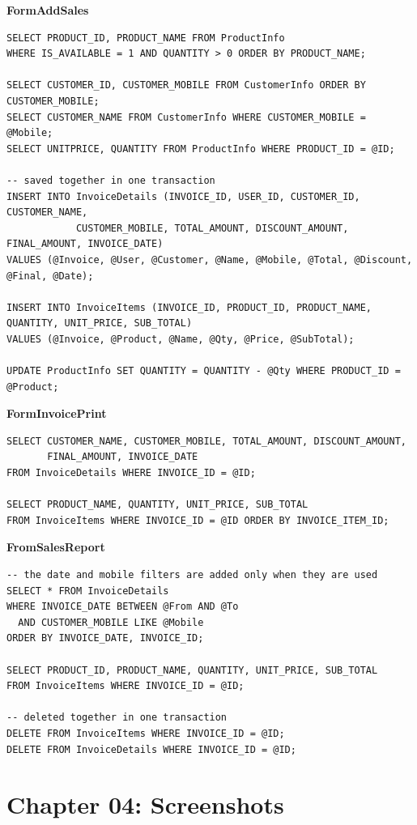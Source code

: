 \documentclass[12pt,a4paper]{article}
\begin{document}
\textbf{FormAddSales}
\begin{lstlisting}
SELECT PRODUCT_ID, PRODUCT_NAME FROM ProductInfo
WHERE IS_AVAILABLE = 1 AND QUANTITY > 0 ORDER BY PRODUCT_NAME;

SELECT CUSTOMER_ID, CUSTOMER_MOBILE FROM CustomerInfo ORDER BY CUSTOMER_MOBILE;
SELECT CUSTOMER_NAME FROM CustomerInfo WHERE CUSTOMER_MOBILE = @Mobile;
SELECT UNITPRICE, QUANTITY FROM ProductInfo WHERE PRODUCT_ID = @ID;

-- saved together in one transaction
INSERT INTO InvoiceDetails (INVOICE_ID, USER_ID, CUSTOMER_ID, CUSTOMER_NAME,
            CUSTOMER_MOBILE, TOTAL_AMOUNT, DISCOUNT_AMOUNT, FINAL_AMOUNT, INVOICE_DATE)
VALUES (@Invoice, @User, @Customer, @Name, @Mobile, @Total, @Discount, @Final, @Date);

INSERT INTO InvoiceItems (INVOICE_ID, PRODUCT_ID, PRODUCT_NAME, QUANTITY, UNIT_PRICE, SUB_TOTAL)
VALUES (@Invoice, @Product, @Name, @Qty, @Price, @SubTotal);

UPDATE ProductInfo SET QUANTITY = QUANTITY - @Qty WHERE PRODUCT_ID = @Product;
\end{lstlisting}

\textbf{FormInvoicePrint}
\begin{lstlisting}
SELECT CUSTOMER_NAME, CUSTOMER_MOBILE, TOTAL_AMOUNT, DISCOUNT_AMOUNT,
       FINAL_AMOUNT, INVOICE_DATE
FROM InvoiceDetails WHERE INVOICE_ID = @ID;

SELECT PRODUCT_NAME, QUANTITY, UNIT_PRICE, SUB_TOTAL
FROM InvoiceItems WHERE INVOICE_ID = @ID ORDER BY INVOICE_ITEM_ID;
\end{lstlisting}

\textbf{FromSalesReport}
\begin{lstlisting}
-- the date and mobile filters are added only when they are used
SELECT * FROM InvoiceDetails
WHERE INVOICE_DATE BETWEEN @From AND @To
  AND CUSTOMER_MOBILE LIKE @Mobile
ORDER BY INVOICE_DATE, INVOICE_ID;

SELECT PRODUCT_ID, PRODUCT_NAME, QUANTITY, UNIT_PRICE, SUB_TOTAL
FROM InvoiceItems WHERE INVOICE_ID = @ID;

-- deleted together in one transaction
DELETE FROM InvoiceItems WHERE INVOICE_ID = @ID;
DELETE FROM InvoiceDetails WHERE INVOICE_ID = @ID;
\end{lstlisting}

\clearpage
\section{Chapter 04: Screenshots}\label{ch:screens}
\end{document}
